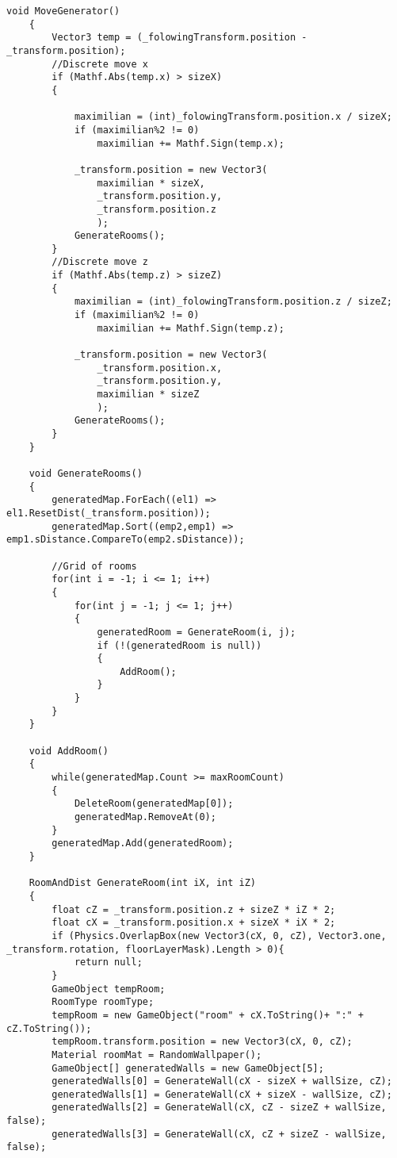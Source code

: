 \documentclass[14pt, titlepage,fleqn,a4paper]{extarticle}
\begin{document}
    \begin{lstlisting}[caption= Генератор карты, label=lst:test]
    void MoveGenerator()
    {
        Vector3 temp = (_folowingTransform.position - _transform.position);
        //Discrete move x
        if (Mathf.Abs(temp.x) > sizeX)
        {
            
            maximilian = (int)_folowingTransform.position.x / sizeX;
            if (maximilian%2 != 0)
                maximilian += Mathf.Sign(temp.x);

            _transform.position = new Vector3(
                maximilian * sizeX,
                _transform.position.y,
                _transform.position.z
                );
            GenerateRooms();
        }
        //Discrete move z
        if (Mathf.Abs(temp.z) > sizeZ)
        {
            maximilian = (int)_folowingTransform.position.z / sizeZ;
            if (maximilian%2 != 0)
                maximilian += Mathf.Sign(temp.z);

            _transform.position = new Vector3(
                _transform.position.x,
                _transform.position.y,
                maximilian * sizeZ
                );
            GenerateRooms();
        }
    }
    
    void GenerateRooms()
    {
        generatedMap.ForEach((el1) => el1.ResetDist(_transform.position));
        generatedMap.Sort((emp2,emp1) => emp1.sDistance.CompareTo(emp2.sDistance));
        
        //Grid of rooms
        for(int i = -1; i <= 1; i++)
        {
            for(int j = -1; j <= 1; j++)
            {
                generatedRoom = GenerateRoom(i, j);
                if (!(generatedRoom is null))
                {
                    AddRoom();
                }
            }
        }
    }

    void AddRoom()
    {
        while(generatedMap.Count >= maxRoomCount)
        {
            DeleteRoom(generatedMap[0]);
            generatedMap.RemoveAt(0);
        }
        generatedMap.Add(generatedRoom);
    }
    
    RoomAndDist GenerateRoom(int iX, int iZ)
    {
        float cZ = _transform.position.z + sizeZ * iZ * 2;
        float cX = _transform.position.x + sizeX * iX * 2;
        if (Physics.OverlapBox(new Vector3(cX, 0, cZ), Vector3.one, _transform.rotation, floorLayerMask).Length > 0){
            return null;
        }
        GameObject tempRoom;
        RoomType roomType;
        tempRoom = new GameObject("room" + cX.ToString()+ ":" + cZ.ToString());
        tempRoom.transform.position = new Vector3(cX, 0, cZ);
        Material roomMat = RandomWallpaper();
        GameObject[] generatedWalls = new GameObject[5];
        generatedWalls[0] = GenerateWall(cX - sizeX + wallSize, cZ);
        generatedWalls[1] = GenerateWall(cX + sizeX - wallSize, cZ);
        generatedWalls[2] = GenerateWall(cX, cZ - sizeZ + wallSize, false);
        generatedWalls[3] = GenerateWall(cX, cZ + sizeZ - wallSize, false);
        

\end{lstlisting}
\end{document}
